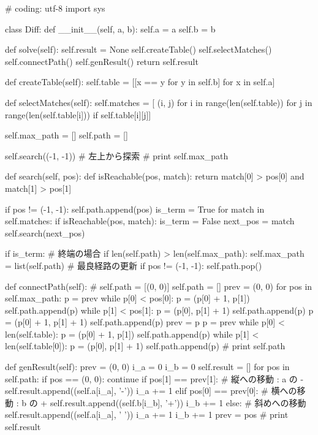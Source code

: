 \begin{mylisting}[label={lst:diff},language=sh,caption=diffコマンド]
# coding: utf-8
import sys

class Diff:
  def __init__(self, a, b):
    self.a = a
    self.b = b

  def solve(self):
    self.result = None
    self.createTable()
    self.selectMatches()
    self.connectPath()
    self.genResult()
    return self.result

  def createTable(self):
    self.table = [[x == y for y in self.b] for x in self.a]

  def selectMatches(self):
    self.matches = [ (i, j)
      for i in range(len(self.table))
      for j in range(len(self.table[i]))
      if self.table[i][j]]

    self.max_path = []
    self.path = []

    self.search((-1, -1)) # 左上から探索
    # print self.max_path

  def search(self, pos):
    def isReachable(pos, match):
      return match[0] > pos[0] and match[1] > pos[1]

    if pos != (-1, -1): self.path.append(pos)
    is_term = True
    for match in self.matches:
      if isReachable(pos, match):
        is_term = False
        next_pos = match
        self.search(next_pos)

    if is_term: # 終端の場合
      if len(self.path) > len(self.max_path):
        self.max_path = list(self.path) # 最良経路の更新
    if pos != (-1, -1): self.path.pop()

  def connectPath(self):
    # self.path = [(0, 0)]
    self.path = []
    prev = (0, 0)
    for pos in self.max_path:
      p = prev
      while p[0] < pos[0]:
        p = (p[0] + 1, p[1])
        self.path.append(p)
      while p[1] < pos[1]:
        p = (p[0], p[1] + 1)
        self.path.append(p)
      p = (p[0] + 1, p[1] + 1)
      self.path.append(p)
      prev = p
    p = prev
    while p[0] < len(self.table):
      p = (p[0] + 1, p[1])
      self.path.append(p)
    while p[1] < len(self.table[0]):
      p = (p[0], p[1] + 1)
      self.path.append(p)
    # print self.path

  def genResult(self):
    prev = (0, 0)
    i_a = 0
    i_b = 0
    self.result = []
    for pos in self.path:
      if pos == (0, 0): continue
      if pos[1] == prev[1]: # 縦への移動 : a の -
        self.result.append((self.a[i_a], '-'))
        i_a += 1
      elif pos[0] == prev[0]: # 横への移動 : b の +
        self.result.append((self.b[i_b], '+'))
        i_b += 1
      else: # 斜めへの移動
        self.result.append((self.a[i_a], ' '))
        i_a += 1
        i_b += 1
      prev = pos
      # print self.result


\end{mylisting}
